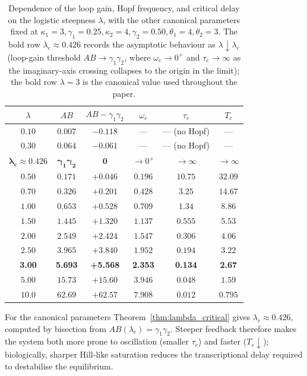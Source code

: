 \documentclass[sn-mathphys,Numbered]{sn-jnl}
\theoremstyle{thmstyleone}
\theoremstyle{thmstyletwo}
\theoremstyle{thmstylethree}
\begin{document}
\begin{table}
\centering
\caption{Dependence of the loop gain, Hopf frequency, and critical
delay on the logistic steepness $\lambda$, with the other canonical
parameters fixed at $\kappa_1=3,\gamma_1=0.25,\kappa_2=4,\gamma_2=0.50,
\theta_1=4,\theta_2=3$. The bold row $\lambda_c\approx 0.426$ records
the asymptotic behaviour as $\lambda\downarrow\lambda_c$
(loop-gain threshold $AB\to\gamma_1\gamma_2$, where $\omega_c\to 0^+$
and $\tau_c\to\infty$ as the imaginary-axis crossing collapses to the
origin in the limit); the bold row $\lambda=3$ is the canonical value
used throughout the paper.}
\label{tab:lambda_sweep}
\begin{tabular}{cccccc}
\toprule
$\lambda$ & $AB$ & $AB-\gamma_1\gamma_2$ & $\omega_c$ & $\tau_c$ & $T_c$ \\
\midrule
$0.10$ & $0.007$ & $-0.118$ & --- & --- (no Hopf) & --- \\
$0.30$ & $0.064$ & $-0.061$ & --- & --- (no Hopf) & --- \\
$\boldsymbol{\lambda_c\approx 0.426}$ & $\boldsymbol{\gamma_1\gamma_2}$ & $\boldsymbol{0}$ & $\to 0^+$ & $\to\infty$ & $\to\infty$ \\
$0.50$ & $0.171$ & $+0.046$ & $0.196$ & $10.75$ & $32.09$ \\
$0.70$ & $0.326$ & $+0.201$ & $0.428$ & $3.25$ & $14.67$ \\
$1.00$ & $0.653$ & $+0.528$ & $0.709$ & $1.34$ & $8.86$ \\
$1.50$ & $1.445$ & $+1.320$ & $1.137$ & $0.555$ & $5.53$ \\
$2.00$ & $2.549$ & $+2.424$ & $1.547$ & $0.306$ & $4.06$ \\
$2.50$ & $3.965$ & $+3.840$ & $1.952$ & $0.194$ & $3.22$ \\
\textbf{3.00} & \textbf{5.693} & \textbf{+5.568} & \textbf{2.353} & \textbf{0.134} & \textbf{2.67} \\
$5.00$ & $15.73$ & $+15.60$ & $3.946$ & $0.048$ & $1.59$ \\
$10.0$ & $62.69$ & $+62.57$ & $7.908$ & $0.012$ & $0.795$ \\
\bottomrule
\end{tabular}
\end{table}

For the canonical parameters Theorem~\ref{thm:lambda_critical} gives
$\lambda_c\approx 0.426$, computed by bisection from
$AB(\lambda_c)=\gamma_1\gamma_2$. Steeper feedback therefore makes the
system both more prone to oscillation (smaller $\tau_c$) and faster
($T_c\downarrow$); biologically, sharper Hill-like saturation reduces
the transcriptional delay required to destabilise the equilibrium.
\end{document}
